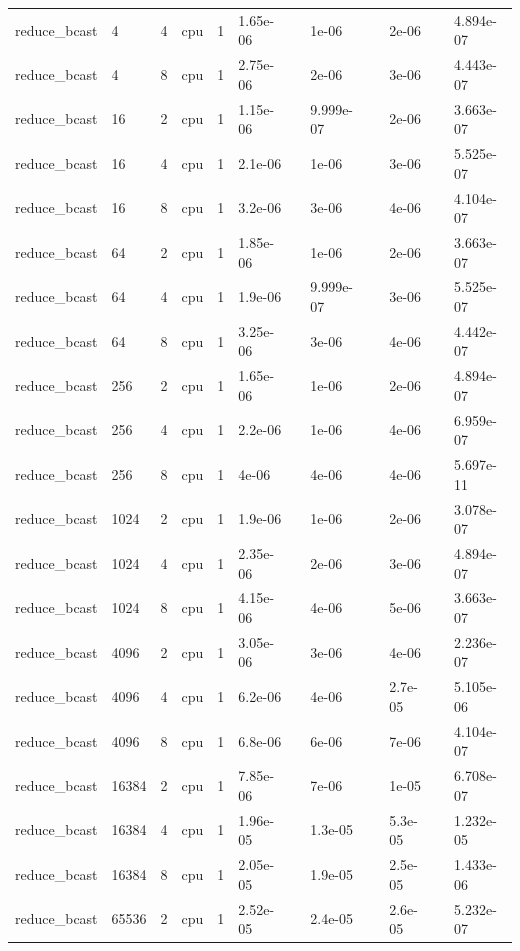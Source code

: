 \begin{tabular}{llllllllllll}
reduce\_bcast & 4 & 4 & cpu & 1 & 1.65e-06 &  & 1e-06 &  & 2e-06 &  & 4.894e-07 \\
reduce\_bcast & 4 & 8 & cpu & 1 & 2.75e-06 &  & 2e-06 &  & 3e-06 &  & 4.443e-07 \\
reduce\_bcast & 16 & 2 & cpu & 1 & 1.15e-06 &  & 9.999e-07 &  & 2e-06 &  & 3.663e-07 \\
reduce\_bcast & 16 & 4 & cpu & 1 & 2.1e-06 &  & 1e-06 &  & 3e-06 &  & 5.525e-07 \\
reduce\_bcast & 16 & 8 & cpu & 1 & 3.2e-06 &  & 3e-06 &  & 4e-06 &  & 4.104e-07 \\
reduce\_bcast & 64 & 2 & cpu & 1 & 1.85e-06 &  & 1e-06 &  & 2e-06 &  & 3.663e-07 \\
reduce\_bcast & 64 & 4 & cpu & 1 & 1.9e-06 &  & 9.999e-07 &  & 3e-06 &  & 5.525e-07 \\
reduce\_bcast & 64 & 8 & cpu & 1 & 3.25e-06 &  & 3e-06 &  & 4e-06 &  & 4.442e-07 \\
reduce\_bcast & 256 & 2 & cpu & 1 & 1.65e-06 &  & 1e-06 &  & 2e-06 &  & 4.894e-07 \\
reduce\_bcast & 256 & 4 & cpu & 1 & 2.2e-06 &  & 1e-06 &  & 4e-06 &  & 6.959e-07 \\
reduce\_bcast & 256 & 8 & cpu & 1 & 4e-06 &  & 4e-06 &  & 4e-06 &  & 5.697e-11 \\
reduce\_bcast & 1024 & 2 & cpu & 1 & 1.9e-06 &  & 1e-06 &  & 2e-06 &  & 3.078e-07 \\
reduce\_bcast & 1024 & 4 & cpu & 1 & 2.35e-06 &  & 2e-06 &  & 3e-06 &  & 4.894e-07 \\
reduce\_bcast & 1024 & 8 & cpu & 1 & 4.15e-06 &  & 4e-06 &  & 5e-06 &  & 3.663e-07 \\
reduce\_bcast & 4096 & 2 & cpu & 1 & 3.05e-06 &  & 3e-06 &  & 4e-06 &  & 2.236e-07 \\
reduce\_bcast & 4096 & 4 & cpu & 1 & 6.2e-06 &  & 4e-06 &  & 2.7e-05 &  & 5.105e-06 \\
reduce\_bcast & 4096 & 8 & cpu & 1 & 6.8e-06 &  & 6e-06 &  & 7e-06 &  & 4.104e-07 \\
reduce\_bcast & 16384 & 2 & cpu & 1 & 7.85e-06 &  & 7e-06 &  & 1e-05 &  & 6.708e-07 \\
reduce\_bcast & 16384 & 4 & cpu & 1 & 1.96e-05 &  & 1.3e-05 &  & 5.3e-05 &  & 1.232e-05 \\
reduce\_bcast & 16384 & 8 & cpu & 1 & 2.05e-05 &  & 1.9e-05 &  & 2.5e-05 &  & 1.433e-06 \\
reduce\_bcast & 65536 & 2 & cpu & 1 & 2.52e-05 &  & 2.4e-05 &  & 2.6e-05 &  & 5.232e-07 \\

\end{tabular}
